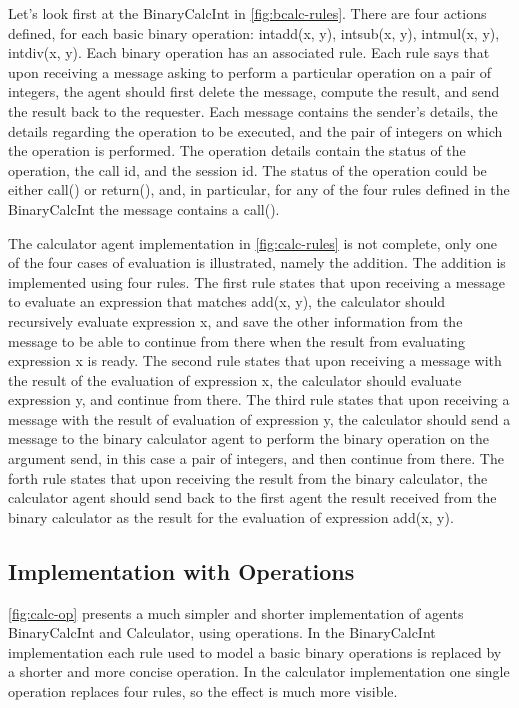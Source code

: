 \documentclass[a4paper,12pt,oneside,fleqn]{book} %
\begin{document}
{Let's look first at the BinaryCalcInt in \autoref{fig:bcalc-rules}. There
are four actions defined, for each basic binary operation: intadd(x, y),
intsub(x, y), intmul(x, y), intdiv(x, y). Each binary operation has an
associated rule. Each rule says that upon receiving a message asking to
perform a particular operation on a pair of integers, the agent should
first delete the message, compute the result, and send the result back to
the requester.  Each message contains the sender's details, the details
regarding the operation to be executed, and the pair of integers on which
the operation is performed. The operation details contain the status of the
operation, the call id, and the session id. The status of the operation
could be either call() or return(), and, in particular, for any of the four
rules defined in the BinaryCalcInt the message contains a call().

The calculator agent implementation in \autoref{fig:calc-rules} is not
complete, only one of the four cases of evaluation is illustrated, namely
the addition. The addition is implemented using four rules. The first rule
states that upon receiving a message to evaluate an expression that matches
add(x, y), the calculator should recursively evaluate expression x, and save
the other information from the message to be able to continue from there when
the result from evaluating expression x is ready. The second rule states
that upon receiving a message with the result of the evaluation of
expression x, the calculator should evaluate expression y, and continue
from there. The third rule states that upon receiving a message with the
result of evaluation of expression y, the calculator should send a message
to the binary calculator agent to perform the binary operation on the
argument send, in this case a pair of integers, and then continue from
there. The forth rule states that upon receiving the result from the
binary calculator, the calculator agent should send back to the first agent
the result received from the binary calculator as the result for the
evaluation of expression add(x, y).
\subsection{Implementation with Operations} %
\autoref{fig:calc-op} presents a much simpler and shorter implementation of
agents BinaryCalcInt and Calculator, using operations. In the BinaryCalcInt
implementation each rule used to model a basic binary operations is
replaced by a shorter and more concise operation. In the calculator
implementation one single operation replaces four rules, so the effect is
much more visible.

}
\end{document}
